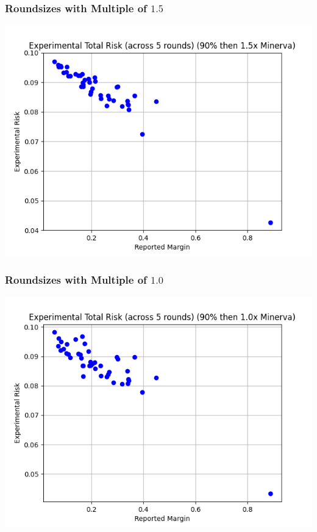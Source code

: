\documentclass{article}
\begin{document}
\subsubsection{Roundsizes with Multiple of $1.5$}

\includegraphics[scale=.7]{minerva_multiround_1p5x_10^6/total_risk.png}

\subsubsection{Roundsizes with Multiple of $1.0$}

\includegraphics[scale=.7]{minerva_multiround_1x_10^4/total_risk.png}
\end{document}
